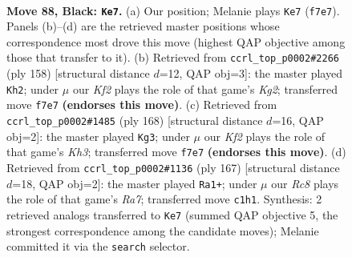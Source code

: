 \documentclass[11pt]{article}
\begin{document}
\clearpage

\begin{figure}[p]\centering
\begin{subfigure}{0.46\textwidth}\centering
\resizebox{\linewidth}{!}{%
\newchessgame
\chessboard[
  setfen={7R/5k2/4pp2/8/P3P3/5P1K/1R6/2r5 b - - 3 88},
  showmover=false,
  pgfstyle=straightmove, color=movearrow, markmove={f7-e7}
]}
\caption{}
\end{subfigure}\hfill
\begin{subfigure}{0.46\textwidth}\centering
\resizebox{\linewidth}{!}{%
\newchessgame
\chessboard[
  setfen={5r1k/2R5/6p1/7p/7P/6P1/6K1/8 w - - 46 80},
  showmover=false,
  pgfstyle=straightmove, color=movearrow, markmove={g2-h2}
]}
\caption{}
\end{subfigure}
\\[4pt]
\begin{subfigure}{0.46\textwidth}\centering
\resizebox{\linewidth}{!}{%
\newchessgame
\chessboard[
  setfen={8/r6k/5p2/4p2P/6P1/5P1K/3R4/8 w - - 71 85},
  showmover=false,
  pgfstyle=straightmove, color=movearrow, markmove={h3-g3}
]}
\caption{}
\end{subfigure}\hfill
\begin{subfigure}{0.46\textwidth}\centering
\resizebox{\linewidth}{!}{%
\newchessgame
\chessboard[
  setfen={4R3/8/7k/6p1/6P1/5P2/r7/4K3 b - - 68 84},
  showmover=false,
  pgfstyle=straightmove, color=movearrow, markmove={a2-a1}
]}
\caption{}
\end{subfigure}
\caption{\textbf{Move 88, Black: \texttt{Ke7}.} (a) Our position; Melanie plays \texttt{Ke7} (\texttt{f7e7}). Panels (b)--(d) are the retrieved master positions whose correspondence most drove this move (highest QAP objective among those that transfer to it). (b) Retrieved from \texttt{ccrl\_top\_p0002\#2266} (ply 158) [structural distance $d$=12, QAP obj=3]: the master played \texttt{Kh2}; under $\mu$ our \emph{Kf2} plays the role of that game's \emph{Kg2}; transferred move \texttt{f7e7} \textbf{(endorses this move)}. (c) Retrieved from \texttt{ccrl\_top\_p0002\#1485} (ply 168) [structural distance $d$=16, QAP obj=2]: the master played \texttt{Kg3}; under $\mu$ our \emph{Kf2} plays the role of that game's \emph{Kh3}; transferred move \texttt{f7e7} \textbf{(endorses this move)}. (d) Retrieved from \texttt{ccrl\_top\_p0002\#1136} (ply 167) [structural distance $d$=18, QAP obj=2]: the master played \texttt{Ra1+}; under $\mu$ our \emph{Rc8} plays the role of that game's \emph{Ra7}; transferred move \texttt{c1h1}. Synthesis: 2 retrieved analogs transferred to \texttt{Ke7} (summed QAP objective 5, the strongest correspondence among the candidate moves); Melanie committed it via the \texttt{search} selector.}
\label{fig:thought-m175}
\end{figure}
\end{document}
